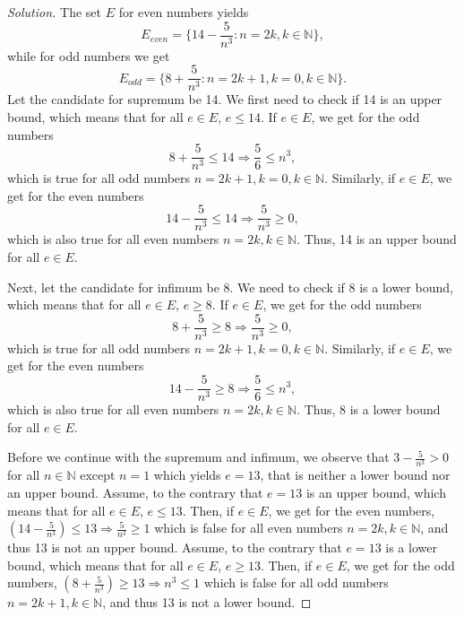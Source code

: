 \documentclass[12pt]{article}
\newenvironment{solution}{\begin{proof}[Solution]}{\end{proof}}
\begin{document}
\begin{solution}
The set $E$ for even numbers yields
\begin{equation}
E_{even}=\{ 14-\frac{5}{n^3}:n=2k, k \in \mathbb{N} \},
\end{equation}
while for odd numbers we get
\begin{equation}
E_{odd}=\{ 8+\frac{5}{n^3} :n=2k+1, k=0, k \in \mathbb{N} \}.
\end{equation}
Let the candidate for supremum be 14. We first need to check if 14 is an upper bound, which means that for all $e \in E$, $e \leq 14$. If $e \in E$, we get for the odd numbers
\begin{equation}
8+\frac{5}{n^3} \leq 14 \Rightarrow \frac{5}{6} \leq n^3,
\end{equation}
which is true for all odd numbers $n=2k+1, k=0, k \in \mathbb{N}$. Similarly, if $e \in E$, we get for the even numbers
\begin{equation}
14-\frac{5}{n^3} \leq 14 \Rightarrow \frac{5}{n^3} \geq 0,
\end{equation}
which is also true for all even numbers $n=2k, k \in \mathbb{N}$. Thus, 14 is an upper bound for all $e \in E$.

Next, let the candidate for infimum be 8. We need to check if 8 is a lower bound, which means that for all $e \in E$, $e \geq 8$. If $e \in E$, we get for the odd numbers
\begin{equation}
8+\frac{5}{n^3} \geq 8 \Rightarrow \frac{5}{n^3} \geq 0,
\end{equation}
which is true for all odd numbers $n=2k+1, k=0, k \in \mathbb{N}$. Similarly, if $e \in E$, we get for the even numbers
\begin{equation}
14-\frac{5}{n^3} \geq 8 \Rightarrow \frac{5}{6} \leq n^3,
\end{equation}
which is also true for all even numbers $n=2k, k \in \mathbb{N}$. Thus, 8 is a lower bound for all $e \in E$.

Before we continue with the supremum and infimum, we observe that $3-\frac{5}{n^3}>0$ for all $n \in \mathbb{N}$ except $n=1$ which yields $e=13$, that is neither a lower bound nor an upper bound. Assume, to the contrary that $e=13$ is an upper bound, which means that for all $e \in E$, $e \leq 13$. Then, if $e \in E$, we get for the even numbers, $(14-\frac{5}{n^3}) \leq 13 \Rightarrow \frac{5}{n^3} \geq 1$ which is false for all even numbers $n=2k, k \in \mathbb{N}$, and thus 13 is not an upper bound. Assume, to the contrary that $e=13$ is a lower bound, which means that for all $e \in E$, $e \geq 13$. Then, if $e \in E$, we get for the odd numbers, $(8+\frac{5}{n^3}) \geq 13 \Rightarrow n^3 \leq 1$ which is false for all odd numbers $n=2k+1, k \in \mathbb{N}$, and thus 13 is not a lower bound. 


\end{solution}
\end{document}
